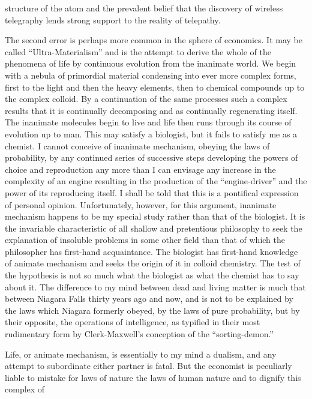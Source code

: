 \documentclass[10.5pt,twoside]{book}
\newcommand{\origpage}[1]{\clearpage\setcounter{page}{#1}}
\begin{document}
\origpage{7}

\noindent structure of the atom and the prevalent belief that the discovery of
wireless telegraphy lends strong support to the reality of telepathy.

The second error is perhaps more common in the sphere of economics. It may be
called ``Ultra-Materialism'' and is the attempt to derive the whole of the
phenomena of life by continuous evolution from the inanimate world. We begin
with a nebula of primordial material condensing into ever more complex forms,
first to the light and then the heavy elements, then to chemical compounds up
to the complex colloid. By a continuation of the same processes such a complex
results that it is continually decomposing and as continually regenerating
itself. The inanimate molecules begin to live and life then runs through its
course of evolution up to man. This may satisfy a biologist, but it fails to
satisfy me as a chemist. I cannot conceive of inanimate mechanism, obeying the
laws of probability, by any continued series of successive steps developing
the powers of choice and reproduction any more than I can envisage any
increase in the complexity of an engine resulting in the production of the
``engine-driver'' and the power of its reproducing itself. I shall be told
that this is a pontifical expression of personal opinion. Unfortunately,
however, for this argument, inanimate mechanism happens to be my special study
rather than that of the biologist. It is the invariable characteristic of all
shallow and pretentious philosophy to seek the explanation of insoluble
problems in some other field than that of which the philosopher has first-hand
acquaintance. The biologist has first-hand knowledge of animate mechanism and
seeks the origin of it in colloid chemistry. The test of the hypothesis is not
so much what the biologist as what the chemist has to say about it. The
difference to my mind between dead and living matter is much that between
Niagara Falls thirty years ago and now, and is not to be explained by the laws
which Niagara formerly obeyed, by the laws of pure probability, but by their
opposite, the operations of intelligence, as typified in their most
rudimentary form by Clerk-Maxwell's conception of the ``sorting-demon.''

Life, or animate mechanism, is essentially to my mind a dualism, and any
attempt to subordinate either partner is fatal. But the economist is
peculiarly liable to mistake for laws of nature the laws of human nature and
to dignify this complex of
\end{document}
